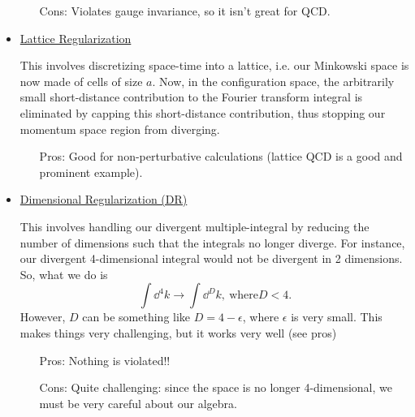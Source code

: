 \begin{itemize}
\begin{enumerate}[leftmargin=0.5in]
            \item[Cons:] Violates gauge invariance, so it isn't great for QCD.
        \end{enumerate}
    \item \ul{Lattice Regularization}
    \item[] This involves discretizing space-time into a lattice, i.e. our Minkowski space is now made of cells of size $a$. Now, in the configuration space, the arbitrarily small short-distance contribution to the Fourier transform integral is eliminated by capping this short-distance contribution, thus stopping our momentum space region from diverging.
    \begin{enumerate}[leftmargin=0.5in]
        \item[Pros:] Good for non-perturbative calculations (lattice QCD is a good and prominent example).
    \end{enumerate}
    \item \ul{Dimensional Regularization (DR)}
    \item[] This involves handling our divergent multiple-integral by reducing the number of dimensions such that the integrals no longer diverge. For instance, our divergent 4-dimensional integral would not be divergent in 2 dimensions. So, what we do is
        \begin{equation}
            \int\dd^4k \rightarrow \int\dd^Dk,\ \text{where} D<4.
        \end{equation}
        However, $D$ can be something like $D=4-\epsilon$, where $\epsilon$ is very small. This makes things very challenging, but it works very well (see pros)
    \begin{enumerate}[leftmargin=0.5in]
        \item[Pros:] Nothing is violated!!
        \item[Cons:] Quite challenging: since the space is no longer 4-dimensional, we must be very careful about our algebra.
    \end{enumerate}
\end{itemize}

